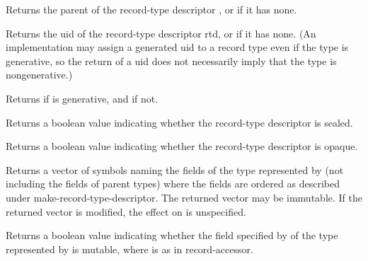 \begin{entry}{%
}
   
Returns the parent of the record-type descriptor , or
\schfalse{} if it has none.
\end{entry}

\begin{entry}{%
}
   
Returns the uid of the record-type descriptor rtd, or \schfalse{} if it has none.
(An implementation may assign a generated uid to a record type even if the
type is generative, so the return of a uid does not necessarily imply that
the type is nongenerative.)
\end{entry}

\begin{entry}{%
}
   
Returns \schtrue{} if  is generative, and \schfalse{} if not.
\end{entry}

\begin{entry}{%
}

Returns a boolean value indicating whether the record-type descriptor is
sealed.
\end{entry}

\begin{entry}{%
}
   
Returns a boolean value indicating whether the record-type descriptor is
opaque.
\end{entry}

\begin{entry}{%
}
   
Returns a vector of symbols naming the fields of the type represented by 
(not including the fields of parent types) where the fields are ordered as
described under {\cf make-record-type-descriptor}.  The returned
vector may be immutable.
If the returned vector is modified, the effect on 
 is unspecified.
\end{entry}

\begin{entry}{%
}
   
Returns a boolean value indicating whether the field specified by
 of the type represented by  is mutable, where 
is as in {\cf record-accessor}.
\end{entry}

